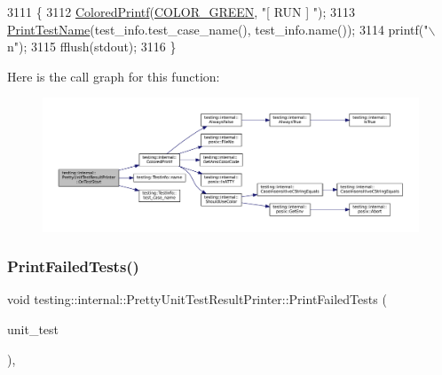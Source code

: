 \begin{DoxyCode}
3111                                                                        \{
3112   \hyperlink{namespacetesting_1_1internal_adef3055706176001364e54eb73a87e31}{ColoredPrintf}(\hyperlink{namespacetesting_1_1internal_a648c1bc94c2ef9e868ff3f9dff0f9c4ea3b1e81f5b14a17b35a8672d57d166507}{COLOR\_GREEN},  \textcolor{stringliteral}{"[ RUN      ] "});
3113   \hyperlink{classtesting_1_1internal_1_1PrettyUnitTestResultPrinter_a5b60a9aed1db02837b11450f6e8d0f71}{PrintTestName}(test\_info.test\_case\_name(), test\_info.name());
3114   printf(\textcolor{stringliteral}{"\(\backslash\)n"});
3115   fflush(stdout);
3116 \}
\end{DoxyCode}
Here is the call graph for this function\+:
\nopagebreak
\begin{figure}[H]
\begin{center}
\leavevmode
\includegraphics[width=350pt]{classtesting_1_1internal_1_1PrettyUnitTestResultPrinter_a5078ee71cfa97e37ae7a9366149195c5_cgraph}
\end{center}
\end{figure}
\mbox{\label{classtesting_1_1internal_1_1PrettyUnitTestResultPrinter_aca5a9dc08998948e293b307d931b3f86}} 
\subsubsection{\texorpdfstring{Print\+Failed\+Tests()}{PrintFailedTests()}}
{\footnotesize\ttfamily void testing\+::internal\+::\+Pretty\+Unit\+Test\+Result\+Printer\+::\+Print\+Failed\+Tests (\begin{DoxyParamCaption}\item[{const \hyperlink{classtesting_1_1UnitTest}{Unit\+Test} \&}]{unit\+\_\+test }\end{DoxyParamCaption})\hspace{0.3cm}{\ttfamily [static]}, {\ttfamily [private]}}



